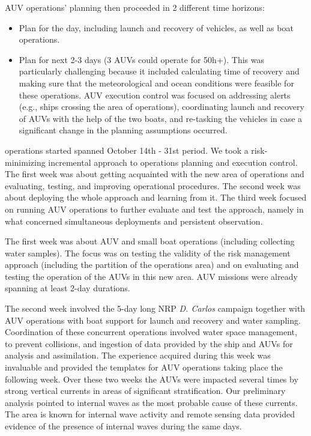 AUV operations’ planning then proceeded in 2 different time horizons:

\begin{itemize}

\item Plan for the day, including launch and recovery of
  vehicles, as well as boat operations. 

\item Plan for next 2-3 days (3 AUVs could operate for 50h+). This was
  particularly challenging
  because it included calculating time of recovery and making sure that
  the meteorological and ocean conditions were feasible for these
  operations. AUV execution control was focused on addressing alerts
  (e.g., ships crossing the area of operations), coordinating launch and
  recovery of AUVs with the help of the two boats, and re-tasking the
  vehicles in case a significant change in the planning assumptions
  occurred. 

\end{itemize}

\proj operations started spanned October 14th - 31st period. We took a
risk-minimizing incremental approach to operations planning and
execution control. The first week was about getting acquainted with the
new area of operations and evaluating, testing, and improving
operational procedures. The second week was about deploying the whole
approach and learning from it. The third week focused on running AUV
operations to further evaluate and test the approach, namely in what
concerned simultaneous deployments and persistent observation.

The first week was about AUV and small boat operations (including
collecting water samples). The focus was on testing the validity of the
risk management approach (including the partition of the operations
area) and on evaluating and testing the operation of the AUVs in this
new area. AUV missions were already spanning at least 2-day durations.

The second week involved the 5-day long NRP \emph{D. Carlos} campaign
together with AUV operations with boat support for launch and recovery
and water sampling. Coordination of these concurrent operations involved
water space management, to prevent collisions, and ingestion of data
provided by the ship and AUVs for analysis and assimilation. The
experience acquired during this week was invaluable and provided the
templates for AUV operations taking place the following week. Over these
two weeks the AUVs were impacted several times by strong vertical
currents in areas of significant stratification. Our preliminary
analysis pointed to internal waves as the most probable cause of these
currents. The area is known for internal wave activity and remote
sensing data provided evidence of the presence of internal waves during
the same days.

